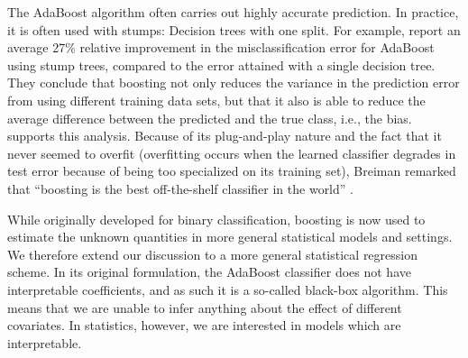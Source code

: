 The AdaBoost algorithm often carries out highly accurate prediction. In practice, it is often used with stumps: Decision trees with one split. For example, \citet{bauer-kohavi} report an average 27\% relative improvement in the misclassification error for AdaBoost using stump trees, compared to the error attained with a single decision tree. They conclude that boosting not only reduces the variance in the prediction error from using different training data sets, but that it also is able to reduce the average difference between the predicted and the true class, i.e., the bias. \citet{breiman1998} supports this analysis. Because of its plug-and-play nature and the fact that it never seemed to overfit (overfitting occurs when the learned classifier degrades in test error because of being too specialized on its training set), Breiman remarked that ``boosting is the best off-the-shelf classifier in the world'' \citep{ESL}.

While originally developed for binary classification, boosting is now used to estimate the unknown quantities in more general statistical models and settings.
We therefore extend our discussion to a more general statistical regression scheme.
In its original formulation, the AdaBoost classifier does not have interpretable coefficients, and as such it is a so-called black-box algorithm.
This means that we are unable to infer anything about the effect of different covariates.
In statistics, however, we are interested in models which are interpretable.



